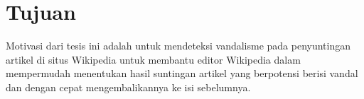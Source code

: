 \section{Tujuan}\label{sec:tujuan}

Motivasi dari tesis ini adalah untuk mendeteksi vandalisme pada penyuntingan artikel di situs Wikipedia untuk membantu editor Wikipedia dalam mempermudah menentukan hasil suntingan artikel yang berpotensi berisi vandal dan dengan cepat mengembalikannya ke isi sebelumnya.